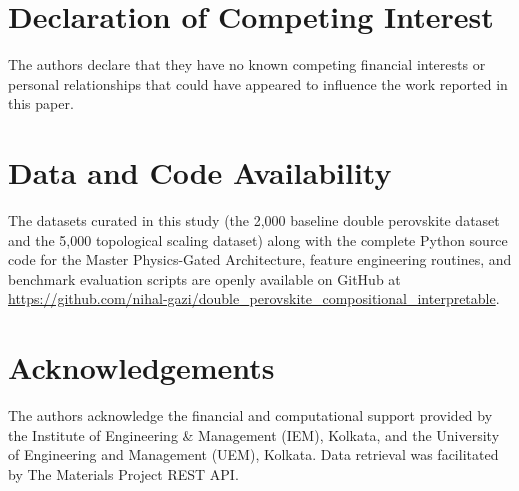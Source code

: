 \documentclass[12pt,onecolumn]{elsarticle}
\begin{document}
\section*{Declaration of Competing Interest}
The authors declare that they have no known competing financial interests or personal relationships that could have appeared to influence the work reported in this paper.

\section*{Data and Code Availability}
The datasets curated in this study (the 2,000 baseline double perovskite dataset and the 5,000 topological scaling dataset) along with the complete Python source code for the Master Physics-Gated Architecture, feature engineering routines, and benchmark evaluation scripts are openly available on GitHub at \url{https://github.com/nihal-gazi/double_perovskite_compositional_interpretable}.

\section*{Acknowledgements}
The authors acknowledge the financial and computational support provided by the Institute of Engineering \& Management (IEM), Kolkata, and the University of Engineering and Management (UEM), Kolkata. Data retrieval was facilitated by The Materials Project REST API.


\end{document}
